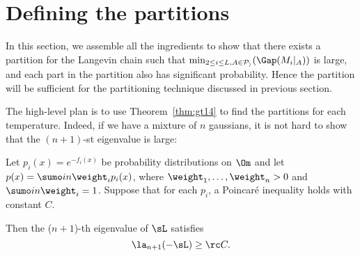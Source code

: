 \section{Defining the partitions}

In this section, we assemble all the ingredients to show that there exists a partition for the Langevin chain such that $\min_{2\le i\le L, A\in \cal P_i}(\Gap(M_i|_A))$ is large, and each part in the partition also has significant probability. Hence the partition will be sufficient for the partitioning technique discussed in previous section.

The high-level plan is to use Theorem~\ref{thm:gt14} to find the partitions for each temperature. Indeed, if we have a mixture of $n$ gaussians, it is not hard to show that the $(n+1)$-st eigenvalue is large:

\begin{lem}\label{lem:m+1-eig} 

Let $p_i (x)= e^{-f_i(x)}$ be probability distributions on $\Om$ and let $p(x) = \sumo in \weight_i p_i(x)$,  
where $\weight_1,\ldots, \weight_n>0$ and $\sumo in \weight_i=1$. %
Suppose that for 
each $p_i$, 
a Poincar\'e inequality holds with constant $C%
$.

Then the ($n+1$)-th eigenvalue of $\sL$ satisfies
$$
\la_{n+1}(-\sL) \ge \rc C. %
$$
\end{lem}

